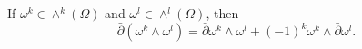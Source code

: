 
If $\omega^k \in \wedge^k(\Omega)$ and $\omega^l \in \wedge^l(\Omega)$, then
$$\bar{\partial}(\omega^k \wedge \omega^l) = \bar{\partial}\omega^k \wedge \omega^l + (-1)^k \omega^k \wedge \bar{\partial}\omega^l.$$
